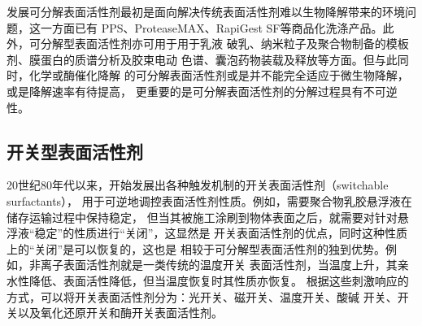 \documentclass[bachelor,fandolfonts,replaceperiod]{jnuthesis}
\begin{document}
    
    发展可分解表面活性剂最初是面向解决传统表面活性剂难以生物降解带来的环境问题，这一方面已有
    PPS、ProteaseMAX、RapiGest SF等商品化洗涤产品。此外，可分解型表面活性剂亦可用于用于乳液
    破乳、纳米粒子及聚合物制备的模板剂\cite{liu2007}、膜蛋白的质谱分析\cite{norris2003}及胶束电动
    色谱\cite{stanley2012}、囊泡药物装载及释放\cite{guo2012}等方面。但与此同时，化学或酶催化降解
    的可分解表面活性剂或是并不能完全适应于微生物降解\cite{tehrani2007}，或是降解速率有待提高，
    更重要的是可分解表面活性剂的分解过程具有不可逆性\cite{liu2007}。
    
    
   \subsection{开关型表面活性剂}
    20世纪80年代以来，开始发展出各种触发机制的开关表面活性剂（switchable surfactants），
    用于可逆地调控表面活性剂性质。例如，需要聚合物乳胶悬浮液在储存运输过程中保持稳定，
    但当其被施工涂刷到物体表面之后，就需要对针对悬浮液“稳定”的性质进行“关闭”，这显然是
    开关表面活性剂的优点\cite{jessop2012}，同时这种性质上的“关闭”是可以恢复的，这也是
    相较于可分解型表面活性剂的独到优势。例如，非离子表面活性剂就是一类传统的温度开关
    表面活性剂，当温度上升，其亲水性降低、表面活性降低，但当温度恢复时其性质亦恢复。
    根据这些刺激响应的方式，可以将开关表面活性剂分为：光开关、磁开关、温度开关、酸碱
    开关、开关以及氧化还原开关和酶开关表面活性剂\cite{秦勇2009}。
    
\end{document}
